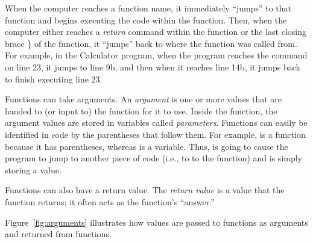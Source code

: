 When the computer reaches a function name, it immediately ``jumps'' to that function and begins executing the code within the function.  Then, when the computer either reaches a \emph{return} command within the function or the last closing brace \} of the function, it ``jumps'' back to where the function was called from.  For example, in the Calculator program, when the program reaches the command  on line 23, it jumps to line 9b, and then when it reaches line 14b, it jumps back to finish executing line 23.

Functions can take arguments.  An \emph{argument} is one or more values that are handed to (or input to) the function for it to use.  Inside the function, the argument values are stored in variables called \emph{parameters}.
Functions can easily be identified in code by the parentheses that follow them.  For example,  is a function because it has parentheses, whereas  is a variable.  Thus,  is going to cause the program to jump to another piece of code (i.e., to to the  function) and  is simply storing a value. 

Functions can also have a return value.
The \emph{return value} is a value that the function returns; it often acts as the function's ``answer.''  

Figure~\ref{fig:arguments} illustrates how values are passed to functions as arguments and returned from functions.

